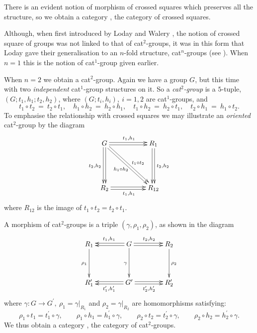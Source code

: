 \documentclass[a4paper,11pt]{article}
\theoremstyle{plain}
\theoremstyle{definition}
\begin{document}
There is an evident notion of morphism of crossed squares  
which preserves all the structure, 
so we obtain a category \catXSq, the category of crossed squares.

\medskip
Although, when first introduced by Loday and Walery \cite{walery-loday}, 
the notion of crossed square of groups was not linked to that of cat$^{2}$-groups, 
it was in this form that Loday gave their generalisation 
to an $n$-fold structure, cat$^{n}$-groups (see \cite{Loday}). 
When $n=1$ this is the notion of cat$^1$-group given earlier.

When $n=2$ we obtain a cat$^{2}$-group. 
Again we have a group $G$, but this time with two \emph{independent} 
cat$^{1}$-group structures on it. 
So a \emph{cat$^{2}$-group} is a $5$-tuple, $(G;t_1,h_1;t_2,h_2)$, 
where $(G;t_{i},h_{i}),~ i=1,2$ are cat$^{1}$-groups, and
\[
t_{1} \circ t_{2} ~=~ t_{2} \circ t_{1}, \quad 
h_{1} \circ h_{2} ~=~ h_{2} \circ h_{1}, \quad 
t_{1} \circ h_{2} ~=~ h_{2} \circ t_{1}, \quad
t_{2} \circ h_{1} ~=~ h_{1} \circ t_{2}. 
\]
To emphasise the relationship with crossed squares 
we may illustrate an \emph{oriented} cat$^2$-group by the diagram 
\begin{equation} \label{cat2-diag}
\xymatrix@R=50pt@C=50pt 
{ G \ar@<+0.4ex>[r]^{t_1,h_1} \ar@<-0.4ex>[r] 
    \ar@<-0.4ex>[d]_{t_2,h_2} \ar@<+0.4ex>[d] 
    \ar@<-0.4ex>[rd]^{\ t_1 \circ t_2} \ar@<+0.4ex>[rd]_{h_1 \circ h_2} 
	& R_1 \ar@<+0.4ex>[d]^{t_2,h_2} \ar@<-0.4ex>[d] \\
  R_2 \ar@<-0.4ex>[r]_{t_1,h_1} \ar@<+0.4ex>[r] 
	& R_{12} 
}
\end{equation} 
where $R_{12}$ is the image of $t_1 \circ t_2 = t_2 \circ t_1$. 

\medskip
A morphism of cat$^{2}$-groups is a triple $(\gamma ,\rho_1 ,\rho_2)$,
as shown in the diagram 
\[
\xymatrix@R=40pt@C=40pt 
{ R_1 \ar[d]_{\rho_1} 
	& G \ar[d]_{\gamma} \ar@<-0.4ex>[l]_{t_1,h_1} \ar@<+0.4ex>[l]  
	                    \ar@<+0.4ex>[r]^{t_2,h_2} \ar@<-0.4ex>[r] 
		& R_2 \ar[d]^{\rho_2} \\
  R'_1 
	& G' \ar@<+0.4ex>[l]^{t'_1,h'_1} \ar@<-0.4ex>[l] 
	     \ar@<-0.4ex>[r]_{t'_2,h'_2} \ar@<+0.4ex>[r] 
		& R'_2 
}
\]
\noindent where 
$\gamma : G \to G^{\prime},~ \rho_1 = \gamma|_{R_1}$ 
and $\rho_2 = \gamma|_{R_2}$ are homomorphisms satisfying: 
\[ 
\rho_1 \circ t_1 = t_1^{\prime} \circ \gamma, \qquad 
\rho_1 \circ h_1 = h_1^{\prime} \circ \gamma, \qquad 
\rho_2 \circ t_2 = t_2^{\prime} \circ \gamma, \qquad 
\rho_2 \circ h_2 = h_2^{\prime} \circ \gamma. 
\] 
We thus obtain a category \catCatt, the category of cat$^{2}$-groups. 
\end{document}
